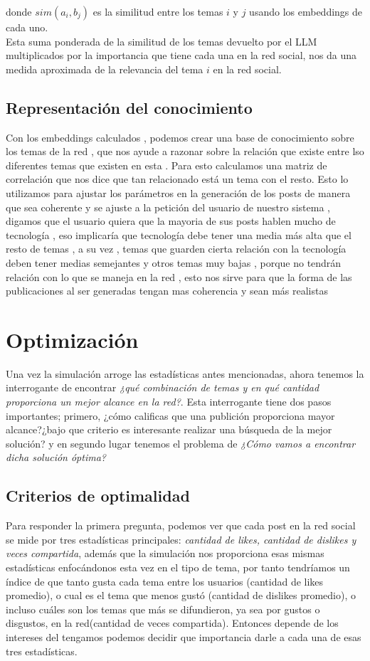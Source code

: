 \documentclass[acmtog]{acmart}
\begin{document}
donde $sim(a_i, b_j)$ es la similitud entre los temas $i$ y $j$ usando los embeddings de cada uno.
\\
Esta suma ponderada de la similitud de los temas devuelto por el LLM multiplicados por la importancia que tiene cada una en la red social, nos da una medida aproximada de la relevancia del tema $i$ en la red social.


\subsection{Representación del conocimiento}
Con los embeddings calculados , podemos crear una base de conocimiento sobre los temas de la red , que nos ayude a razonar sobre la relación que existe entre lso diferentes temas que existen en esta . Para esto calculamos una matriz de correlación que nos dice que tan relacionado está un tema con el resto. Esto lo utilizamos para ajustar los parámetros en la generación de los posts de manera que sea coherente y se ajuste a la petición del usuario de nuestro sistema , digamos que el usuario quiera que la mayoria de sus posts hablen mucho de tecnología , eso implicaría que tecnología debe tener una media más alta que el resto de temas , a su vez , temas que guarden cierta relación con la tecnología deben tener medias semejantes y otros temas muy bajas , porque no tendrán relación con lo que se maneja en la red , esto nos sirve para que la forma de las publicaciones al ser generadas tengan mas coherencia y sean más realistas


\section{Optimización}

Una vez la simulación arroge las estadísticas antes mencionadas, ahora tenemos la interrogante de encontrar \textit{¿qué combinación de temas y en qué cantidad proporciona un mejor alcance en la red?}.
Esta interrogante tiene dos pasos importantes; primero, ¿cómo calificas que una publición proporciona mayor alcance?¿bajo que criterio es interesante realizar una búsqueda de la mejor solución? y
en segundo lugar tenemos el problema de \textit{¿Cómo vamos a encontrar dicha solución óptima?}

\subsection{Criterios de optimalidad}

Para responder la primera pregunta, podemos ver que cada post en la red social se mide por tres estadísticas principales: \textit{cantidad de likes, cantidad de dislikes y veces compartida}, además que
la simulación nos proporciona esas mismas estadísticas enfocándonos esta vez en el tipo de tema, por tanto tendríamos un índice de que tanto gusta cada tema entre los usuarios (cantidad de likes promedio),
o cual es el tema que menos gustó (cantidad de dislikes promedio), o incluso cuáles son los temas que más se difundieron, ya sea por gustos o disgustos, en la red(cantidad de veces compartida). Entonces depende
de los intereses del tengamos podemos decidir que importancia darle a cada una de esas tres estadísticas.
\end{document}
